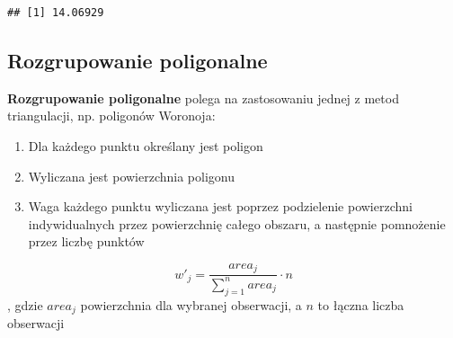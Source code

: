 \documentclass[
  paper=6in:9in,pagesize=pdftex,headinclude=on,footinclude=on,10pt]{scrbook}
\newenvironment{Shaded}{\begin{snugshade}}{\end{snugshade}}
\newcommand{\AttributeTok}[1]{\textcolor[rgb]{0.13,0.29,0.53}{#1}}
\newcommand{\ConstantTok}[1]{\textcolor[rgb]{0.56,0.35,0.01}{#1}}
\newcommand{\DecValTok}[1]{\textcolor[rgb]{0.00,0.00,0.81}{#1}}
\newcommand{\FunctionTok}[1]{\textcolor[rgb]{0.13,0.29,0.53}{\textbf{#1}}}
\newcommand{\NormalTok}[1]{#1}
\newcommand{\OtherTok}[1]{\textcolor[rgb]{0.56,0.35,0.01}{#1}}
\newcommand{\SpecialCharTok}[1]{\textcolor[rgb]{0.81,0.36,0.00}{\textbf{#1}}}
\newcommand{\StringTok}[1]{\textcolor[rgb]{0.31,0.60,0.02}{#1}}
\providecommand{\tightlist}{%
  \setlength{\itemsep}{0pt}\setlength{\parskip}{0pt}}
\begin{document}
\begin{Shaded}
\end{Shaded}

\begin{verbatim}
## [1] 14.06929
\end{verbatim}

\subsection{Rozgrupowanie poligonalne}\label{rozgrupowanie-poligonalne}

\textbf{Rozgrupowanie poligonalne} polega na zastosowaniu jednej z metod triangulacji, np. poligonów Woronoja:

\begin{enumerate}
\def\labelenumi{\arabic{enumi}.}
\tightlist
\item
  Dla każdego punktu określany jest poligon
\item
  Wyliczana jest powierzchnia poligonu
\item
  Waga każdego punktu wyliczana jest poprzez podzielenie powierzchni indywidualnych przez powierzchnię całego obszaru, a następnie pomnożenie przez liczbę punktów
\end{enumerate}

\[w'_j=\frac{area_j}{\sum_{j=1}^{n}area_j} \cdot n\]
, gdzie \(area_j\) powierzchnia dla wybranej obserwacji, a \(n\) to łączna liczba obserwacji

\begin{Shaded}
\end{Shaded}
\end{document}
